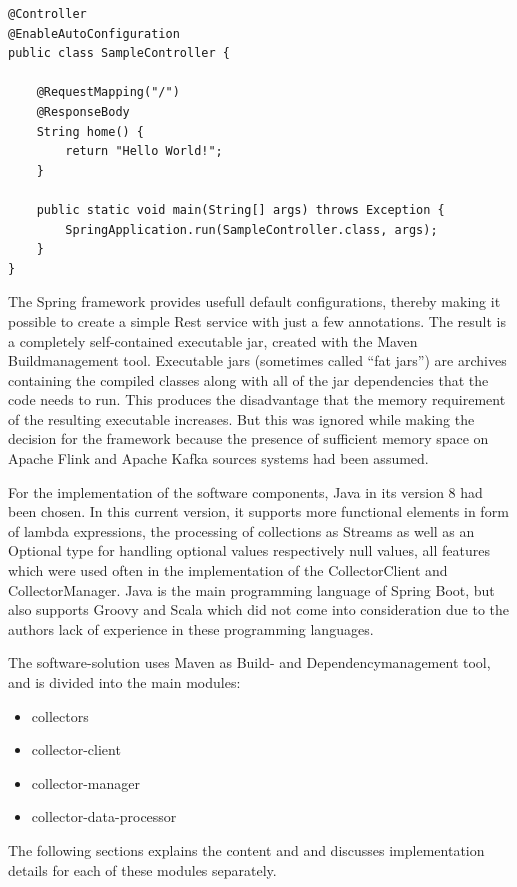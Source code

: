 \begin{lstlisting}[caption={Spring Boot "Hello World"}, captionpos=b, label={lst:spring-boot-hello-world}]
@Controller
@EnableAutoConfiguration
public class SampleController {

    @RequestMapping("/")
    @ResponseBody
    String home() {
        return "Hello World!";
    }

    public static void main(String[] args) throws Exception {
        SpringApplication.run(SampleController.class, args);
    }
}
\end{lstlisting}

The Spring framework provides usefull default configurations, thereby making it possible to create a simple Rest service
with just a few annotations. The result is a completely self-contained executable jar, created with the Maven
Buildmanagement tool. Executable jars (sometimes called “fat jars”) are archives containing the compiled classes along with
all of the jar dependencies that the code needs to run. This produces the disadvantage that the memory requirement of the
resulting executable increases. But this was ignored while making the decision for the framework because the presence of
sufficient memory space on Apache Flink and Apache Kafka sources systems had been assumed.

For the implementation of the software components, Java in its version 8 had been chosen. In this current version,
it supports more functional elements in form of lambda expressions, the processing of collections as Streams as well
as an Optional type for handling optional values respectively null values, all features which were used often in the
implementation of the CollectorClient and CollectorManager. Java is the main programming language of Spring Boot, but also
supports Groovy and Scala which did not come into consideration due to the authors lack of experience in these programming
languages.

The software-solution uses Maven as Build- and Dependencymanagement tool, and is divided into the main modules:

\begin{itemize}
	\item collectors
	\item collector-client
	\item collector-manager
	\item collector-data-processor
\end{itemize}

The following sections explains the content and and discusses implementation details for each of these modules separately.

